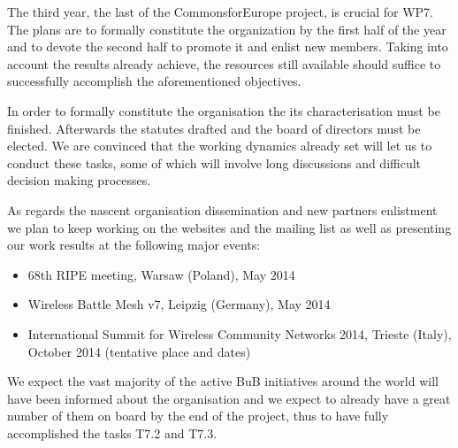 The third year, the last of the CommonsforEurope project, is crucial for WP7. The plans are to formally constitute the organization by the first half of the year and to devote the second half to promote it and enlist new members. Taking into account the results already achieve, the resources still available should suffice to successfully accomplish the aforementioned objectives.

In order to formally constitute the organisation the its characterisation must be finished. Afterwards the statutes drafted and the board of directors must be elected. We are convinced that the working dynamics already set will let us to conduct these tasks, some of which will involve long discussions and difficult decision making processes.

As regards the nascent organisation dissemination and new partners enlistment we plan to keep working on the websites and the mailing list as well as presenting our work results at the following major events:

\begin{itemize}
  \setlength{\itemindent}{2em}
  \item 68th RIPE meeting, Warsaw (Poland), May 2014
  \item Wireless Battle Mesh v7, Leipzig (Germany), May 2014
  \item International Summit for Wireless Community Networks 2014, Trieste (Italy), October 2014 (tentative place and dates)
\end{itemize}

We expect the vast majority of the active BuB initiatives around the world will have been informed about the organisation and we expect to already have a great number of them on board by the end of the project, thus to have fully accomplished the tasks T7.2 and T7.3.